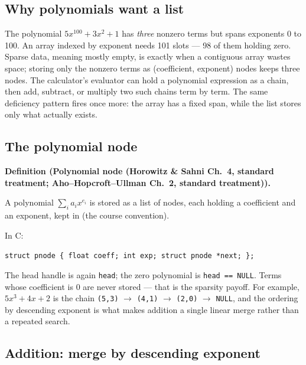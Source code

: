 \documentclass[11pt]{article}
\newenvironment{definitionbox}[1]{%
  \par\noindent\textbf{Definition (#1).}\ \itshape
}{\par\vspace{0.3em}}
\begin{document}
\subsection{Why polynomials want a list}

The polynomial $5x^{100} + 3x^{2} + 1$ has \emph{three} nonzero terms but spans exponents 0 to 100. An array indexed by exponent needs 101 slots --- 98 of them holding zero. Sparse data, meaning mostly empty, is exactly when a contiguous array wastes space; storing only the nonzero terms as (coefficient, exponent) nodes keeps three nodes. The calculator's evaluator can hold a polynomial expression as a chain, then add, subtract, or multiply two such chains term by term. The same deficiency pattern fires once more: the array has a fixed span, while the list stores only what actually exists.

\subsection{The polynomial node}

\begin{definitionbox}{Polynomial node (Horowitz \& Sahni Ch.~4, standard treatment; Aho--Hopcroft--Ullman Ch.~2, standard treatment)}
A polynomial $\sum_i a_i x^{e_i}$ is stored as a list of nodes, each holding a coefficient and an exponent, kept in  (the course convention). \cite{HorowitzSahni2008_fundamentals_data_structures,AhoHopcroftUllman1983_data_structures_algorithms}
\end{definitionbox}

\noindent In C:
\begin{center}
{\small \texttt{struct pnode \{ float coeff; int exp; struct pnode *next; \};}}
\end{center}

The head handle is again \texttt{head}; the zero polynomial is \texttt{head == NULL}. Terms whose coefficient is $0$ are never stored --- that is the sparsity payoff. For example, $5x^{3} + 4x + 2$ is the chain \texttt{(5,3)} $\to$ \texttt{(4,1)} $\to$ \texttt{(2,0)} $\to$ \texttt{NULL}, and the ordering by descending exponent is what makes addition a single linear merge rather than a repeated search.

\subsection{Addition: merge by descending exponent}
\end{document}
